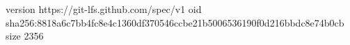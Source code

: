 version https://git-lfs.github.com/spec/v1
oid sha256:8818a6c7bb4fc8e4c1360df370546ccbe21b5006536190f0d216bbdc8e74b0cb
size 2356
